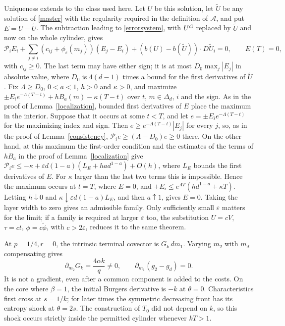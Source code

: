 \documentclass[11pt]{article}
\newcommand{\eps}{\varepsilon}
\newcommand{\cA}{\mathcal A}
\begin{document}
Uniqueness extends to the class used here. Let $U$ be this solution, let $\widetilde U$ be any solution of \eqref{master} with the regularity required in the definition of $\cA$, and put $E=U-\widetilde U$. The subtraction leading to \eqref{errorsystem}, with $U^{\rm cl}$ replaced by $\widetilde U$ and now on the whole cylinder, gives
\[
 \mathcal P_iE_i+\sum_{j\ne i}(c_{ij}+\phi_\eps(m_j))(E_j-E_i)+(b(U)-b(\widetilde U))\cdot D\widetilde U_i=0,\qquad E(T)=0,
\]
with $c_{ij}\ge0$. The last term may have either sign; it is at most $D_0\max_j|E_j|$ in absolute value, where $D_0$ is $4(d-1)$ times a bound for the first derivatives of $\widetilde U$. Fix $\Lambda\ge D_0$, $0<a<1$, $h>0$ and $\kappa>0$, and maximize $\pm E_ie^{-\Lambda(T-t)}+hB_a(m)-\kappa(T-t)$ over $t$, $m\in\Delta_d$, $i$ and the sign. As in the proof of Lemma~\ref{localization}, bounded first derivatives of $E$ place the maximum in the interior. Suppose that it occurs at some $t<T$, and let $e=\pm E_ie^{-\Lambda(T-t)}$ for the maximizing index and sign. Then $e\ge e^{-\Lambda(T-t)}|E_j|$ for every $j$, so, as in the proof of Lemma~\ref{consistency}, $\mathcal P_ie\ge(\Lambda-D_0)e\ge0$ there. On the other hand, at this maximum the first-order condition and the estimates of the terms of $hB_a$ in the proof of Lemma~\ref{localization} give $\mathcal P_ie\le-\kappa+\eps d(1-a)(L_E+had^{1-a})+O(h)$, where $L_E$ bounds the first derivatives of $E$. For $\kappa$ larger than the last two terms this is impossible. Hence the maximum occurs at $t=T$, where $E=0$, and $\pm E_i\le e^{\Lambda T}(hd^{1-a}+\kappa T)$. Letting $h\downarrow0$ and $\kappa\downarrow\eps d(1-a)L_E$, and then $a\uparrow1$, gives $E=0$. Taking the layer width to zero gives an admissible family. Only sufficiently small $\eps$ matters for the limit; if a family is required at larger $\eps$ too, the substitution $U=cV$, $\tau=ct$, $\phi=c\widetilde\phi$, with $c>2\eps$, reduces it to the same theorem.

At $p=1/4,r=0$, the intrinsic terminal covector is $G_k\,dm_1$. Varying $m_2$ with $m_d$ compensating gives
\[
 \partial_{m_2}G_k=\frac{4\alpha k}{q}\ne0,
 \qquad \partial_{m_1}(g_2-g_d)=0.
\]
It is not a gradient, even after a common component is added to the costs. On the core where $\beta=1$, the initial Burgers derivative is $-k$ at $\theta=0$. Characteristics first cross at $s=1/k$; for later times the symmetric decreasing front has its entropy shock at $\theta=2s$. The construction of $T_0$ did not depend on $k$, so this shock occurs strictly inside the permitted cylinder whenever $kT>1$.
\end{document}
